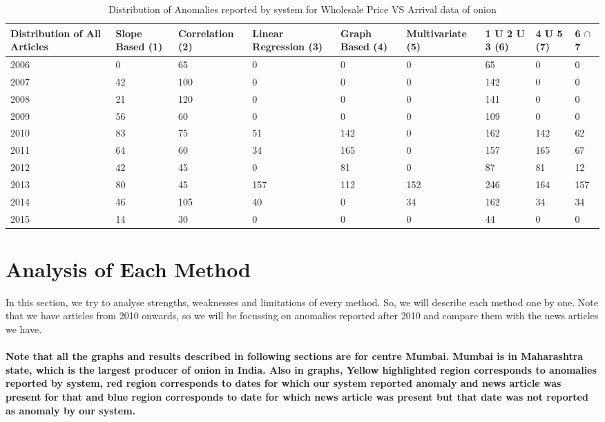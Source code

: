\documentclass[a4paper,10pt]{report}
\begin{document}
	
	\begin{table}[]
	\centering
	\resizebox{\textwidth}{!}
	{\begin{tabular}{|l|l|l|l|l|l|l|l|l|}
	\hline
	Distribution of All Articles & Slope Based (1) & Correlation (2) & Linear Regression (3) & Graph Based (4) & Multivariate (5) & 1 U 2 U 3 (6) & 4 U 5 (7) & 6 $\cap$ 7  \\
	\hline
	2006 & 0  & 65  & 0   & 0   & 0   & 65  & 0   & 0   \\
	\hline
	2007 & 42 & 100 & 0   & 0   & 0   & 142 & 0   & 0   \\
	\hline
	2008 & 21 & 120 & 0   & 0   & 0   & 141 & 0   & 0   \\
	\hline
	2009 & 56 & 60  & 0   & 0   & 0   & 109 & 0   & 0   \\
	\hline
	2010 & 83 & 75  & 51  & 142 & 0   & 162 & 142 & 62  \\
	\hline
	2011 & 64 & 60  & 34  & 165 & 0   & 157 & 165 & 67  \\
	\hline
	2012 & 42 & 45  & 0   & 81  & 0   & 87  & 81  & 12  \\
	\hline
	2013 & 80 & 45  & 157 & 112 & 152 & 246 & 164 & 157 \\
	\hline
	2014 & 46 & 105 & 40  & 0   & 34  & 162 & 34  & 34  \\
	\hline
	2015 & 14 & 30  & 0   & 0   & 0   & 44  & 0   & 0   \\
	\hline
	\end{tabular}}
	\caption{Distribution of Anomalies reported by system for Wholesale Price VS Arrival data of onion }
	\label{WholesaleVsArrivalDist}
	\end{table}
	

	
\section{Analysis of Each Method}

In this section, we try to analyse strengths, weaknesses and limitations of every method. So, we will describe each method one by one. Note that we have articles from 2010 onwards, so we will be focussing on anomalies reported after 2010 and compare them with the news articles we have. \\
\\
\textbf{Note that all the graphs and results described in following sections are for centre Mumbai. Mumbai is in Maharashtra state, which is the largest producer of onion in India. Also in graphs, Yellow highlighted region corresponds to anomalies reported by system, red region corresponds to dates for which our system reported anomaly and news article was present for that and blue region corresponds to date for which news article was present but that date was not reported as anomaly by our system.}
\end{document}
